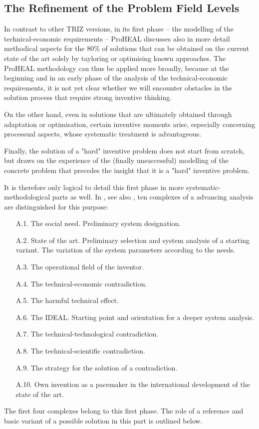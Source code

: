 \documentclass[11pt,a4paper]{article}
\begin{document}
\subsection{The Refinement of the Problem Field Levels}

In contrast to other TRIZ versions, in its first phase -- the modelling of the
technical-economic requirements -- ProHEAL discusses also in more detail
methodical aspects for the 80\% of solutions that can be obtained on the
current state of the art solely by tayloring or optimising known approaches.
The ProHEAL methodology can thus be applied more broadly, because at the
beginning and in an early phase of the analysis of the technical-economic
requirements, it is not yet clear whether we will encounter obstacles in the
solution process that require strong inventive thinking.

On the other hand, even in solutions that are ultimately obtained through
adaptation or optimisation, certain inventive moments arise, especially
concerning processual aspects, whose systematic treatment is advantageous.

Finally, the solution of a "hard" inventive problem does not start from
scratch, but draws on the experience of the (finally unsuccessful) modelling
of the concrete problem that precedes the insight that it is a "hard"
inventive problem.

It is therefore only logical to detail this first phase in more
systematic-methodological parts as well. In \cite[Part A]{RT89}, see also
\cite[Part 3]{RM-21}, ten complexes of a advancing analysis are distinguished
for this purpose:
\begin{itemize}[leftmargin=40pt,align=left]
\item[A.1.] The social need. Preliminary system designation.
\item[A.2.] State of the art. Preliminary selection and system analysis of a
  starting variant. The variation of the system parameters according to the
  needs.
\item[A.3.] The operational field of the inventor.
\item[A.4.] The technical-economic contradiction.
\item[A.5.] The harmful technical effect.
\item[A.6.] The IDEAL. Starting point and orientation for a deeper system
  analysis.
\item[A.7.] The technical-technological contradiction.
\item[A.8.] The technical-scientific contradiction.
\item[A.9.] The strategy for the solution of a contradiction.
\item[A.10.] Own invention as a pacemaker in the international
  development of the state of the art.
\end{itemize}
The first four complexes belong to this first phase.  The role of a reference
and basic variant of a possible solution in this part is outlined below.
\end{document}
